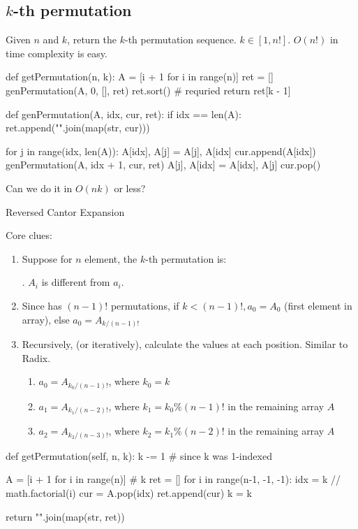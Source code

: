\subsection{$k$-th permutation}
Given $n$ and $k$, return the $k$-th permutation sequence. $k\in [1, n!]$. $O(n!)$ in time complexity is easy.
\begin{python}
def getPermutation(n, k):
    A = [i + 1 for i in range(n)]
    ret = []
    genPermutation(A, 0, [], ret)
    ret.sort()  # requried 
    return ret[k - 1]

def genPermutation(A, idx, cur, ret):
    if idx == len(A):
        ret.append("".join(map(str, cur)))

    for j in range(idx, len(A)):
        A[idx], A[j] = A[j], A[idx]
        cur.append(A[idx])
        genPermutation(A, idx + 1, cur, ret)
        A[j], A[idx] = A[idx], A[j]
        cur.pop()
\end{python}

Can we do it in $O(nk)$ or less?

Reversed Cantor Expansion

Core clues:
\begin{enumerate}
\item {}

Suppose for $n$ element, the $k$-th permutation is:

. $A_i$ is different from $a_i$.
\item {} Since \pyinline{[a1, a3, ..., an-1]} has $(n-1)!$ permutations,
if $k < (n-1)!, a_0 = A_0$ (first element in array), else $a_0 = A_{k/(n-1)!}$

\item Recursively, (or iteratively), calculate the values at each position. Similar to Radix. 
\begin{enumerate}
\item $a_0 = A_{k_0/(n-1)!}$, where $k_0 = k$
\item $a_1 = A_{k_1/(n-2)!}$, where $k_1 = k_0\%(n-1)!$ in the remaining array $A$
\item $a_2 = A_{k_2/(n-3)!}$, where $k_2 = k_1\%(n-2)!$ in the remaining array $A$
\end{enumerate}
\end{enumerate}
\begin{python}
def getPermutation(self, n, k):
    k -= 1  # since k was 1-indexed

    A = [i + 1 for i in range(n)]
    # k %
    ret = []
    for i in range(n-1, -1, -1):
        idx = k // math.factorial(i) 
        cur = A.pop(idx)
        ret.append(cur)
        k = k %

    return "".join(map(str, ret))
\end{python}

